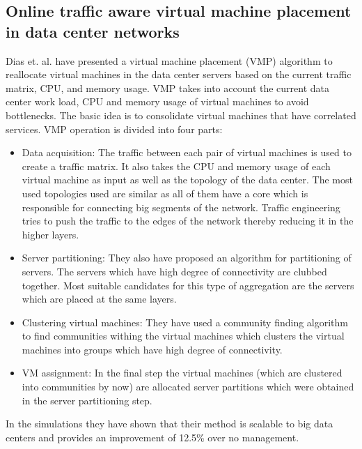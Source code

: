 \subsubsection{}

\subsection{Online traffic aware virtual machine placement in data center networks}
Dias et. al.\cite{dias2012online} have presented a virtual machine placement (VMP) algorithm to reallocate virtual machines in the data center servers based on the current traffic matrix, CPU, and memory usage. VMP takes into account the current data center work load, CPU and memory usage of virtual machines to avoid bottlenecks. The basic idea is to consolidate virtual machines that have correlated services. VMP operation is divided into four parts:

\begin{itemize}
    \item Data acquisition: The traffic between each pair of virtual machines is used to create a traffic matrix. It also takes the CPU and memory usage of each virtual machine as input as well as the topology of the data center. The most used topologies used are similar as all of them have a core which is responsible for connecting big segments of the network. Traffic engineering tries to push the traffic to the edges of the network thereby reducing it in the higher layers. 
    \item Server partitioning: They also have proposed an algorithm for partitioning of servers. The servers which have high degree of connectivity are clubbed together. Most suitable candidates for this type of aggregation are the servers which are placed at the same layers.
    \item Clustering virtual machines: They \cite{dias2012online} have used a community finding algorithm to find communities withing the virtual machines which clusters the virtual machines into groups which have high degree of connectivity.
    \item VM assignment: In the final step the virtual machines (which are clustered into communities by now) are allocated server partitions which were obtained in the server partitioning step.
\end{itemize}
In the simulations they have shown that their method is scalable to big data centers and provides an improvement of 12.5\% over no management.

